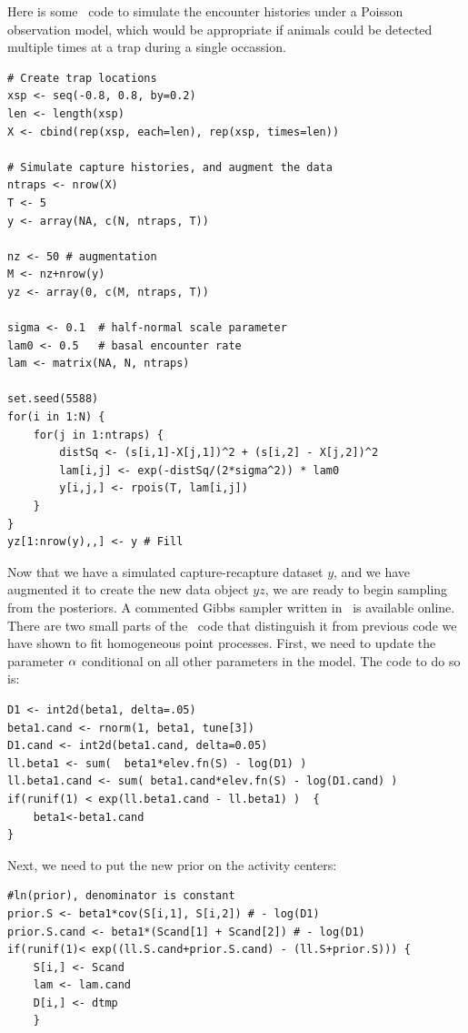 Here is some \R~code to simulate the encounter histories under a
Poisson observation model, which would be appropriate if animals could
be detected multiple times at a trap during a single occassion.

\begin{small}
\begin{verbatim}
# Create trap locations
xsp <- seq(-0.8, 0.8, by=0.2)
len <- length(xsp)
X <- cbind(rep(xsp, each=len), rep(xsp, times=len))

# Simulate capture histories, and augment the data
ntraps <- nrow(X)
T <- 5
y <- array(NA, c(N, ntraps, T))

nz <- 50 # augmentation
M <- nz+nrow(y)
yz <- array(0, c(M, ntraps, T))

sigma <- 0.1  # half-normal scale parameter
lam0 <- 0.5   # basal encounter rate
lam <- matrix(NA, N, ntraps)

set.seed(5588)
for(i in 1:N) {
    for(j in 1:ntraps) {
        distSq <- (s[i,1]-X[j,1])^2 + (s[i,2] - X[j,2])^2
        lam[i,j] <- exp(-distSq/(2*sigma^2)) * lam0
        y[i,j,] <- rpois(T, lam[i,j])
    }
}
yz[1:nrow(y),,] <- y # Fill
\end{verbatim}
\end{small}

Now that we have a simulated capture-recapture dataset $y$, and we have
augmented it to create the new data object $yz$, we are ready to
begin sampling from the posteriors. A commented Gibbs sampler written
in \R~is available online. There are two small parts of the
\R~code that distinguish it from previous code we have shown to
fit homogeneous point processes. First, we need to update the parameter
${\bf \alpha}$ conditional on all other parameters in the model. The code to
do so is:

\begin{small}
\begin{verbatim}
D1 <- int2d(beta1, delta=.05)
beta1.cand <- rnorm(1, beta1, tune[3])
D1.cand <- int2d(beta1.cand, delta=0.05)
ll.beta1 <- sum(  beta1*elev.fn(S) - log(D1) )
ll.beta1.cand <- sum( beta1.cand*elev.fn(S) - log(D1.cand) )
if(runif(1) < exp(ll.beta1.cand - ll.beta1) )  {
    beta1<-beta1.cand
}
\end{verbatim}
\end{small}

Next, we need to put the new prior on the activity centers:

\begin{small}
\begin{verbatim}
#ln(prior), denominator is constant
prior.S <- beta1*cov(S[i,1], S[i,2]) # - log(D1)
prior.S.cand <- beta1*(Scand[1] + Scand[2]) # - log(D1)
if(runif(1)< exp((ll.S.cand+prior.S.cand) - (ll.S+prior.S))) {
    S[i,] <- Scand
    lam <- lam.cand
    D[i,] <- dtmp
    }
\end{verbatim}
\end{small}

